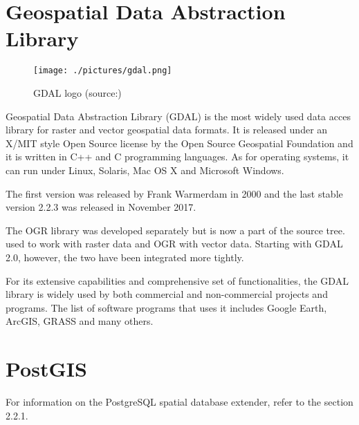 \section{Geospatial Data Abstraction Library} \label{gdal}

\begin{figure}[H] \centering
      \texttt{[image: ./pictures/gdal.png]}
      \caption[GDAL logo]{GDAL logo (source:{\cite{gdal}})}
      \label{fig:GDAL}
  \end{figure}

  Geospatial Data Abstraction Library (GDAL) is the most widely
  used data acces library for raster and vector geospatial
  data formats. It is released under an X/MIT style Open Source
  license by the Open Source Geospatial Foundation and it is written
  in C++ and C programming languages. As for operating systems, it can
  run under Linux, Solaris, Mac OS X and Microsoft Windows.\cite{gdal}

  The first version was released by Frank Warmerdam in 2000 and the
  last stable version 2.2.3 was released in November
  2017.\cite{gdalrelease}


  The OGR library was developed separately but is now a part of
  the  source tree.  used to work with raster data
  and OGR with vector data. Starting with GDAL 2.0, however, the two
  have been integrated more tightly.

  For its extensive capabilities and comprehensive set of
  functionalities, the GDAL library is widely used by both
  commercial and non-commercial  projects and programs. The
  list of software programs that uses it includes Google Earth,
  ArcGIS, GRASS  and many others.\cite{gdalogr}

  
  \section{PostGIS}
  
  For information on the PostgreSQL spatial database extender, refer to the section 2.2.1.

